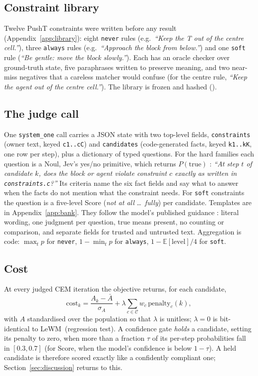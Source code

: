 \documentclass[11pt]{article}
\newcommand{\jev}{Jev}
\newcommand{\lewm}{LeWM}
\begin{document}
\subsection{Constraint library}
Twelve PushT constraints were written before any result (Appendix~\ref{app:library}): eight \texttt{never} rules (e.g.\ \emph{``Keep the T out of the centre cell.''}), three \texttt{always} rules (e.g.\ \emph{``Approach the block from below.''}) and one \texttt{soft} rule (\emph{``Be gentle: move the block slowly.''}). Each has an oracle checker over ground-truth state, five paraphrases written to preserve meaning, and two near-miss negatives that a careless matcher would confuse (for the centre rule, \emph{``Keep the agent out of the centre cell.''}). The library is frozen and hashed (\texttt{}).

\subsection{The judge call}\label{sec:method-judge}
One \texttt{system\_one} call carries a JSON state with two top-level fields, \texttt{constraints} (owner text, keyed \texttt{c1..cC}) and \texttt{candidates} (code-generated facts, keyed \texttt{k1..kK}, one row per step), plus a dictionary of typed questions. For the hard families each question is a Noul, \jev's yes/no primitive, which returns $P(\text{true})$ \citep{typesafe2026jev}: \emph{``At step $t$ of candidate $k$, does the block or agent violate constraint $c$ exactly as written in \texttt{constraints.c}?''} Its criteria name the six fact fields and say what to answer when the facts do not mention what the constraint needs. For \texttt{soft} constraints the question is a five-level Score (\emph{not at all} \ldots\ \emph{fully}) per candidate. Templates are in Appendix~\ref{app:bank}. They follow the model's published guidance \citep{typesafe2026jev}: literal wording, one judgment per question, true means present, no counting or comparison, and separate fields for trusted and untrusted text. Aggregation is code: $\max_t p$ for \texttt{never}, $1-\min_t p$ for \texttt{always}, $1-\mathbb{E}[\text{level}]/4$ for \texttt{soft}.

\subsection{Cost}\label{sec:method-cost}
At every judged CEM iteration the objective returns, for each candidate,
\[
\mathrm{cost}_k = \frac{A_k-\bar A}{\sigma_A} + \lambda \sum_{c\in\mathcal{C}} w_c\, \mathrm{penalty}_c(k),
\]
with $A$ standardised over the population so that $\lambda$ is unitless; $\lambda=0$ is bit-identical to \lewm\ (regression test). A confidence gate \emph{holds} a candidate, setting its penalty to zero, when more than a fraction $\tau$ of its per-step probabilities fall in $[0.3,0.7]$ (for Score, when the model's confidence is below $1-\tau$). A held candidate is therefore scored exactly like a confidently compliant one; Section~\ref{sec:discussion} returns to this.
\end{document}
